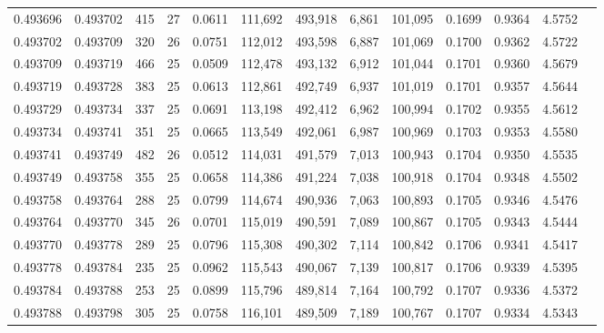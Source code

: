 \begin{tabular}{rrrrrrrrrrrrr}
0.493696 & 0.493702 & 415 &  27 &                                     0.0611 & 111,692 & 493,918 &   6,861 & 101,095 & 0.1699 & 0.9364 & 4.5752 \\
0.493702 & 0.493709 & 320 &  26 &                                     0.0751 & 112,012 & 493,598 &   6,887 & 101,069 & 0.1700 & 0.9362 & 4.5722 \\
0.493709 & 0.493719 & 466 &  25 &                                     0.0509 & 112,478 & 493,132 &   6,912 & 101,044 & 0.1701 & 0.9360 & 4.5679 \\
0.493719 & 0.493728 & 383 &  25 &                                     0.0613 & 112,861 & 492,749 &   6,937 & 101,019 & 0.1701 & 0.9357 & 4.5644 \\
0.493729 & 0.493734 & 337 &  25 &                                     0.0691 & 113,198 & 492,412 &   6,962 & 100,994 & 0.1702 & 0.9355 & 4.5612 \\
0.493734 & 0.493741 & 351 &  25 &                                     0.0665 & 113,549 & 492,061 &   6,987 & 100,969 & 0.1703 & 0.9353 & 4.5580 \\
0.493741 & 0.493749 & 482 &  26 &                                     0.0512 & 114,031 & 491,579 &   7,013 & 100,943 & 0.1704 & 0.9350 & 4.5535 \\
0.493749 & 0.493758 & 355 &  25 &                                     0.0658 & 114,386 & 491,224 &   7,038 & 100,918 & 0.1704 & 0.9348 & 4.5502 \\
0.493758 & 0.493764 & 288 &  25 &                                     0.0799 & 114,674 & 490,936 &   7,063 & 100,893 & 0.1705 & 0.9346 & 4.5476 \\
0.493764 & 0.493770 & 345 &  26 &                                     0.0701 & 115,019 & 490,591 &   7,089 & 100,867 & 0.1705 & 0.9343 & 4.5444 \\
0.493770 & 0.493778 & 289 &  25 &                                     0.0796 & 115,308 & 490,302 &   7,114 & 100,842 & 0.1706 & 0.9341 & 4.5417 \\
0.493778 & 0.493784 & 235 &  25 &                                     0.0962 & 115,543 & 490,067 &   7,139 & 100,817 & 0.1706 & 0.9339 & 4.5395 \\
0.493784 & 0.493788 & 253 &  25 &                                     0.0899 & 115,796 & 489,814 &   7,164 & 100,792 & 0.1707 & 0.9336 & 4.5372 \\
0.493788 & 0.493798 & 305 &  25 &                                     0.0758 & 116,101 & 489,509 &   7,189 & 100,767 & 0.1707 & 0.9334 & 4.5343 \\

\end{tabular}

